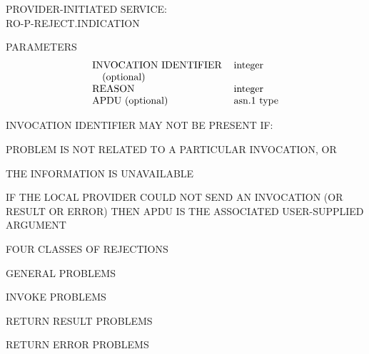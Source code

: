 \begin{bwslide}

\begin{nrtc}
\item   PROVIDER-INITIATED SERVICE:\\ RO-P-REJECT.INDICATION

\item   PARAMETERS
\[\begin{tabular}{ll}
    INVOCATION IDENTIFIER&      integer\\
    \ \ \ (optional)&           \\
    REASON&                     integer\\
    APDU (optional)&            asn.1 type\\
\end{tabular}\]

\item   INVOCATION IDENTIFIER MAY NOT BE PRESENT IF:
    \begin{nrtc}
    \item       PROBLEM IS NOT RELATED TO A PARTICULAR INVOCATION, OR

    \item       THE INFORMATION IS UNAVAILABLE
    \end{nrtc}

\item   IF THE LOCAL PROVIDER COULD NOT SEND AN INVOCATION (OR RESULT OR ERROR)
        THEN APDU IS THE ASSOCIATED USER-SUPPLIED ARGUMENT
\end{nrtc}
\end{bwslide}




\begin{bwslide}

\begin{nrtc}
\item   FOUR CLASSES OF REJECTIONS
    \begin{nrtc}
    \item       GENERAL PROBLEMS

    \item       INVOKE PROBLEMS

    \item       RETURN RESULT PROBLEMS

    \item       RETURN ERROR PROBLEMS
    \end{nrtc}
\end{nrtc}
\end{bwslide}



